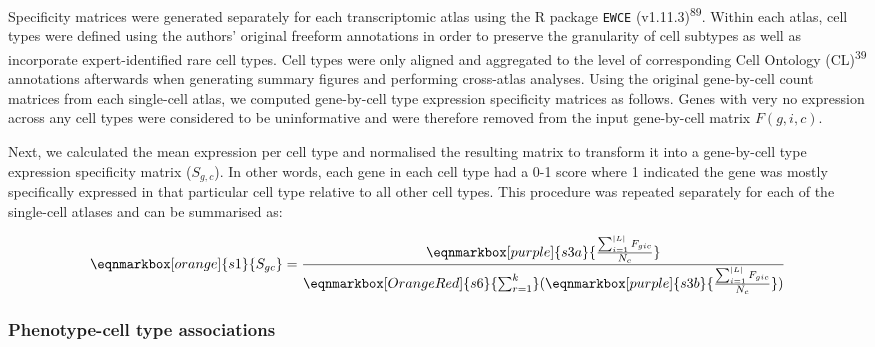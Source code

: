 \documentclass[
]{article}
\begin{document}
Specificity matrices were generated separately for each transcriptomic
atlas using the R package \texttt{EWCE} (v1.11.3)\textsuperscript{89}.
Within each atlas, cell types were defined using the authors' original
freeform annotations in order to preserve the granularity of cell
subtypes as well as incorporate expert-identified rare cell types. Cell
types were only aligned and aggregated to the level of corresponding
Cell Ontology (CL)\textsuperscript{39} annotations afterwards when
generating summary figures and performing cross-atlas analyses. Using
the original gene-by-cell count matrices from each single-cell atlas, we
computed gene-by-cell type expression specificity matrices as follows.
Genes with very no expression across any cell types were considered to
be uninformative and were therefore removed from the input gene-by-cell
matrix \(F(g,i,c)\).

Next, we calculated the mean expression per cell type and normalised the
resulting matrix to transform it into a gene-by-cell type expression
specificity matrix (\(S_{g,c}\)). In other words, each gene in each cell
type had a 0-1 score where 1 indicated the gene was mostly specifically
expressed in that particular cell type relative to all other cell types.
This procedure was repeated separately for each of the single-cell
atlases and can be summarised as:

\hfill\break

\begin{equation*}
  \eqnmarkbox[orange]{s1}{S_{gc}}
  =
  \frac{
    \eqnmarkbox[purple]{s3a}{
      \frac{
        \sum_{i=1}^{|L|} F_{gic}
      }{
        N_c  
      }
    } 
  }{
   \eqnmarkbox[OrangeRed]{s6}{\sum_{r=1}^{k}}(
     \eqnmarkbox[purple]{s3b}{
      \frac{
        \sum_{i=1}^{|L|} F_{gic}
      }{
        N_c  
      }
    } 
   ) 
  }
\end{equation*}

\hfill\break

\subsubsection{Phenotype-cell type
associations}\label{phenotype-cell-type-associations-1}
\end{document}
